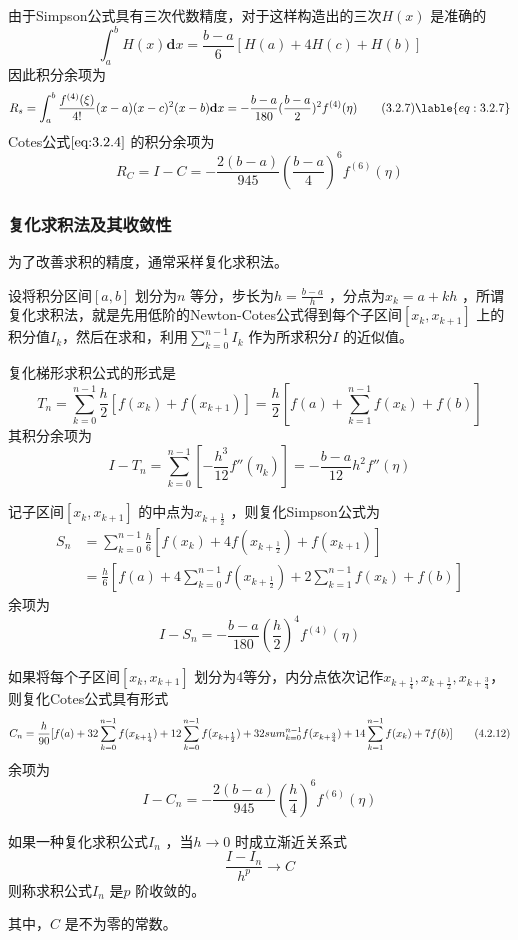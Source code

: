 \documentclass[a4paper]{article}
\begin{document}
由于Simpson公式具有三次代数精度，对于这样构造出的三次$H(x)$ 是准确的
\[
	\int_{a}^{b} H(x) \mathbf{d} x = \frac{b - a}{6} [H(a) + 4H(c) + H(b)] 
\] 
因此积分余项为
\[
	R_s = \int_{a}^{b} \frac{f^{(4)}(\xi)}{4!} (x-a) (x-c)^2 (x-b) \mathbf{d} x = - \frac{b - a}{180} (\frac{b-a}{2})^2 f^{(4)}(\eta) \tag{3.2.7} \lable{eq:3.2.7}
\] 
Cotes公式$\ref{eq:3.2.4}$ 的积分余项为
\[
	R_C = I - C = - \frac{2 (b-a)}{945} (\frac{b-a}{4})^{6} f^{(6)}(\eta) \tag{3.2.8} \label{eq:3.2.8}
\] 
\subsubsection{复化求积法及其收敛性}
为了改善求积的精度，通常采样复化求积法。

设将积分区间$[a,b]$ 划分为$n$ 等分，步长为$h = \frac{b - a}{h}$ ，分点为$x_{k} = a + kh$ ，所谓复化求积法，就是先用低阶的Newton-Cotes公式得到每个子区间$[x_{k},x_{k+1}]$ 上的积分值$I_k$，然后在求和，利用$\sum_{k=0}^{n-1} I_k$ 作为所求积分$I$ 的近似值。

复化梯形求积公式的形式是
\[
	T_n = \sum_{k=0}^{n-1} \frac{h}{2} [f(x_{k}) + f(x_{k+1})] = \frac{h}{2} [f(a) + \sum_{k=1}^{n-1} f(x_{k}) + f(b)] \tag{3.2.9} \label{eq:3.2.9}
\] 
其积分余项为
\[
	I - T_n = \sum_{k=0}^{n-1} [- \frac{h^3}{12} f''(\eta_k)] = - \frac{b-a}{12} h^2 f''(\eta) \tag{3.2.10} \label{eq:3.2.10}
\] 

记子区间$[x_{k},x_{k+1}]$ 的中点为$x_{k+\frac{1}{2}}$ ，则复化Simpson公式为
\[
	\tag{3.2.11} \label{eq:3.2.11}
	\begin{aligned}
		S_n &= \sum_{k=0}^{n-1} \frac{h}{6} [f(x_{k}) + 4 f(x_{k+\frac{1}{2}}) + f(x_{k+1})] \\
		    &= \frac{h}{6} [f(a) + 4 \sum_{k=0}^{n-1} f(x_{k+\frac{1}{2}}) + 2 \sum_{k=1}^{n-1} f(x_{k}) + f(b)]
	\end{aligned}
\] 
余项为
\[
I - S_n = - \frac{b-a}{180} (\frac{h}{2})^{4} f^{(4)} (\eta)
\] 

如果将每个子区间$[x_{k},x_{k+1}]$ 划分为4等分，内分点依次记作$x_{k+\frac{1}{4}}, x_{k+\frac{1}{2}}, x_{k+\frac{3}{4}}$，则复化Cotes公式具有形式
\[
	C_n = \frac{h}{90}[ f(a) + 32 \sum_{k=0}^{n-1} f(x_{k+\frac{1}{4}}) + 12 \sum_{k=0}^{n-1} f(x_{k+\frac{1}{2}}) + 32 \\sum_{k=0}^{n-1} f(x_{k+\frac{3}{4}}) + 14 \sum_{k=1}^{n-1} f(x_{k}) + 7 f(b)] \tag{4.2.12} \label{eq:4.2.12}
\] 
余项为
\[
I - C_n = - \frac{2 (b-a)}{945} (\frac{h}{4})^{6} f^{(6)}(\eta)
\] 

\begin{definition}
	如果一种复化求积公式$I_n$ ，当$h \to 0$ 时成立渐近关系式
	\[
	\frac{I - I_n}{h^{p}} \to C
	\] 
	则称求积公式$I_n$ 是$p$ 阶收敛的。
\end{definition}
其中，$C$ 是不为零的常数。
\end{document}
